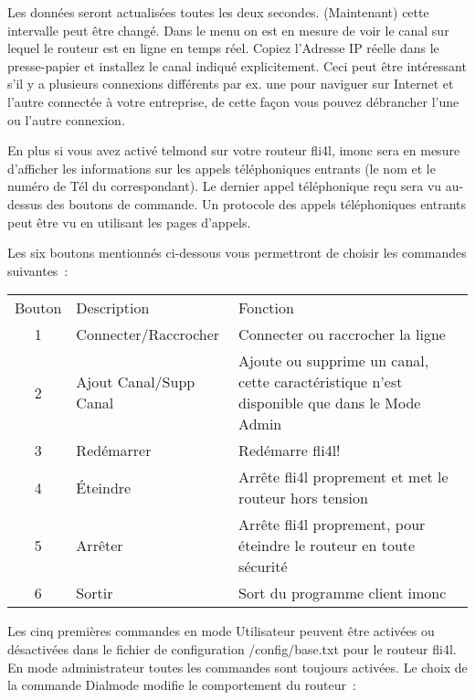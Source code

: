   \medskip

  Les données seront actualisées toutes les deux secondes. (Maintenant) cette
  intervalle peut être changé. Dans le menu on est en mesure de voir le
  canal sur lequel le routeur est en ligne en temps réel. Copiez l'Adresse IP
  réelle dans le presse-papier et installez le canal indiqué explicitement.
  Ceci peut être intéressant s'il y a plusieurs connexions différents par ex.
  une pour naviguer sur Internet et l'autre connectée à votre entreprise,
  de cette façon vous pouvez débrancher l'une ou l'autre connexion.

  En plus si vous avez activé telmond sur votre routeur fli4l, imonc sera en
  mesure d'afficher les informations sur les appels téléphoniques entrants
  (le nom et le numéro de Tél du correspondant). Le dernier appel téléphonique
  reçu sera vu au-dessus des boutons de commande. Un protocole des appels
  téléphoniques entrants peut être vu en utilisant les pages d'appels.

  Les six boutons mentionnés ci-dessous vous permettront de choisir les commandes
  suivantes~:

  \begin{tabular}{clp{9cm}}
    Bouton & Description      & Fonction\\
    1& Connecter/Raccrocher   & Connecter ou raccrocher la ligne\\
    2& Ajout Canal/Supp Canal & Ajoute ou supprime un canal, cette caractéristique
                                n'est disponible que dans le Mode Admin\\
    3& Redémarrer             & Redémarre fli4l!\\
    4& Éteindre               & Arrête fli4l proprement et met le routeur hors tension\\
    5& Arrêter                & Arrête fli4l proprement, pour éteindre le routeur 
                                en toute sécurité\\
    6& Sortir                 & Sort du programme client imonc\\
  \end{tabular}

  \medskip

  \noindent Les cinq premières commandes en mode Utilisateur peuvent être activées
  ou désactivées dans le fichier de configuration /config/base.txt pour le
  routeur fli4l. En mode administrateur toutes les commandes sont toujours
  activées.
  Le choix de la commande Dialmode modifie le comportement du routeur~:


